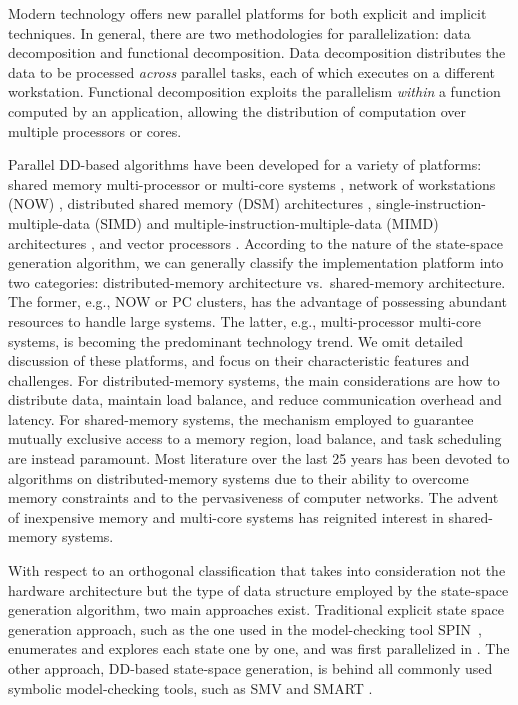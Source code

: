 \documentclass[copyright,creativecommons]{eptcs}
\begin{document}
Modern technology offers new parallel platforms for both explicit and
implicit techniques.
In general, there are two methodologies for parallelization:
data decomposition and functional decomposition.
Data decomposition distributes the data to be processed \emph{across} parallel
tasks, each of which executes on a different workstation. 
Functional decomposition exploits the parallelism \emph{within}
a function computed by an application, allowing the distribution
of computation over multiple processors or cores.

Parallel DD-based algorithms have been developed for a variety of platforms:
shared memory multi-processor or multi-core systems \cite{Stornetta1995},
network of workstations (NOW) \cite{Milvang1998},
distributed shared memory (DSM) architectures \cite{Parasuram1994},
single-instruction-multiple-data (SIMD) and
multiple-instruction-multiple-data (MIMD) architectures \cite{Gai1995},
and vector processors \cite{Ochi1991Vector}.
According to the nature of the state-space generation algorithm,
we can generally classify the implementation platform into  two categories:
distributed-memory architecture vs.\ shared-memory architecture.
The former, e.g., NOW or PC clusters, has the advantage of possessing abundant
resources to handle large systems. 
The latter, e.g., multi-processor multi-core systems, is becoming
the predominant technology trend.
We omit detailed discussion of these platforms, and focus on their
characteristic features and challenges.
For distributed-memory systems, the main considerations are how to distribute
data, maintain load balance, and reduce communication overhead and latency.
For shared-memory systems, the mechanism employed to guarantee mutually
exclusive access to a memory region, load balance, and task scheduling
are instead paramount.
Most literature over the last 25 years has been devoted to algorithms on
distributed-memory systems due to their ability to overcome memory constraints
and to the pervasiveness of computer networks.
The advent of inexpensive memory and multi-core systems has reignited interest
in shared-memory systems.

With respect to an orthogonal classification that takes into consideration not
the hardware architecture but the type of data structure employed
by the state-space generation algorithm, two main approaches exist.
Traditional explicit state space generation approach, such as the one
used in the model-checking tool SPIN~\cite{Holzmann2003spin},
enumerates and explores each state one by one, and was first
parallelized in \cite{1998INFORMSJC-DistrGen,1997JPDC-AutomaticDistrGen,Stern97murphi}.
The other approach, DD-based state-space generation, is behind all
commonly used symbolic model-checking tools, such as
SMV \cite{McMillan1992SMV} and SMART \cite{2009PER-SMART}.
\end{document}
